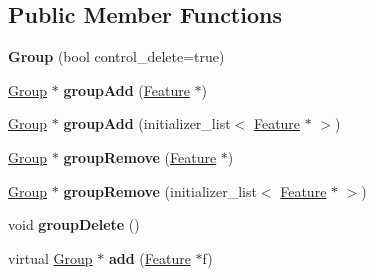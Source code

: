 \subsection*{Public Member Functions}
\begin{DoxyCompactItemize}
\item 
\hypertarget{classj3d_1_1core_1_1Group_aad98596f5fce0065e466aa8adecb9425}{}{\bfseries Group} (bool control\+\_\+delete=true)\label{classj3d_1_1core_1_1Group_aad98596f5fce0065e466aa8adecb9425}

\item 
\hypertarget{classj3d_1_1core_1_1Group_a821f3e0f7c9a896b907b4dbe069c7cb0}{}\hyperlink{classj3d_1_1core_1_1Group}{Group} $\ast$ {\bfseries group\+Add} (\hyperlink{classj3d_1_1core_1_1Feature}{Feature} $\ast$)\label{classj3d_1_1core_1_1Group_a821f3e0f7c9a896b907b4dbe069c7cb0}

\item 
\hypertarget{classj3d_1_1core_1_1Group_abcf63693db9788ec6ad1a576cb415ec4}{}\hyperlink{classj3d_1_1core_1_1Group}{Group} $\ast$ {\bfseries group\+Add} (initializer\+\_\+list$<$ \hyperlink{classj3d_1_1core_1_1Feature}{Feature} $\ast$ $>$)\label{classj3d_1_1core_1_1Group_abcf63693db9788ec6ad1a576cb415ec4}

\item 
\hypertarget{classj3d_1_1core_1_1Group_aff4d04686fc01797834c16002f3a7c79}{}\hyperlink{classj3d_1_1core_1_1Group}{Group} $\ast$ {\bfseries group\+Remove} (\hyperlink{classj3d_1_1core_1_1Feature}{Feature} $\ast$)\label{classj3d_1_1core_1_1Group_aff4d04686fc01797834c16002f3a7c79}

\item 
\hypertarget{classj3d_1_1core_1_1Group_afef85ea04b05cb9a774499608250624d}{}\hyperlink{classj3d_1_1core_1_1Group}{Group} $\ast$ {\bfseries group\+Remove} (initializer\+\_\+list$<$ \hyperlink{classj3d_1_1core_1_1Feature}{Feature} $\ast$ $>$)\label{classj3d_1_1core_1_1Group_afef85ea04b05cb9a774499608250624d}

\item 
\hypertarget{classj3d_1_1core_1_1Group_a97d8cfe41662dace45c6894ae632ddde}{}void {\bfseries group\+Delete} ()\label{classj3d_1_1core_1_1Group_a97d8cfe41662dace45c6894ae632ddde}

\item 
\hypertarget{classj3d_1_1core_1_1Group_ac6d787e9fcb2d11a519a122112b61cb4}{}virtual \hyperlink{classj3d_1_1core_1_1Group}{Group} $\ast$ {\bfseries add} (\hyperlink{classj3d_1_1core_1_1Feature}{Feature} $\ast$f)\label{classj3d_1_1core_1_1Group_ac6d787e9fcb2d11a519a122112b61cb4}


\end{DoxyCompactItemize}
